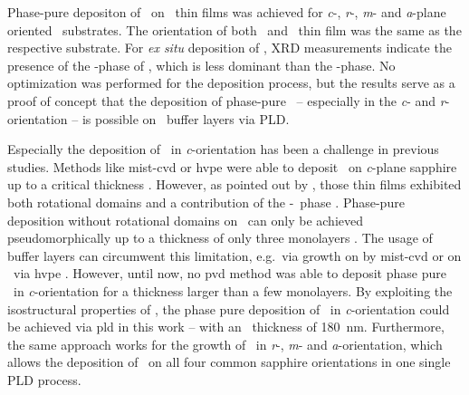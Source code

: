 Phase-pure depositon of \agao\ on \cro\ thin films was achieved for \textit{c}-, \textit{r}-, \textit{m}- and \textit{a}-plane oriented \alo\ substrates.
The orientation of both \cro\ and \agao\ thin film was the same as the respective substrate.
For \textit{ex situ} deposition of \gao, XRD measurements indicate the presence of the \textkappa-phase of \gao, which is less dominant than the \textalpha-phase.
No optimization was performed for the deposition process, but the results serve as a proof of concept that the deposition of phase-pure \agao\ -- especially in the \textit{c}- and \textit{r}-orientation -- is possible on \cro\ buffer layers via PLD.

Especially the deposition of \agao\ in \textit{c}-orientation has been a challenge in previous studies.
Methods like mist-\gls{cvd} or \gls{hvpe} were able to deposit \agao\ on \textit{c}-plane sapphire up to a critical thickness
    \cite{jinno2020}.
However, as pointed out by \textcite{schewski2015}, those thin films exhibited both rotational domains and a contribution of the \textbeta-\gao\ phase
    \cite{shinohara2008,oshima2007}.
Phase-pure deposition without rotational domains on \alo\ can only be achieved pseudomorphically up to a thickness of only three monolayers
    \cite{schewski2015}.
The usage of buffer layers can circumwent this limitation, e.g.\ via growth on  by mist-\gls{cvd}
    \cite{akaiwa2013}
or on \cro\ via \gls{hvpe}
    \cite{polyakov2022,polyakov2022a}.
However, until now, no \gls{pvd} method was able to deposit phase pure \agao\ in \textit{c}-orientation for a thickness larger than a few monolayers.
By exploiting the isostructural properties of \cro, the phase pure deposition of \agao\ in \textit{c}-orientation could be achieved via \acrlong{pld} in this work -- with an \agao\ thickness of \qty{180}{\nm}.
Furthermore, the same approach works for the growth of \agao\ in \textit{r}-, \textit{m}- and \textit{a}-orientation, which allows the deposition of \agao\ on all four common sapphire orientations in one single PLD process.